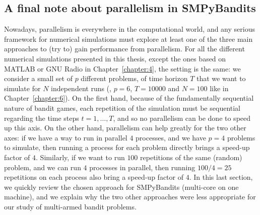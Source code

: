 \begin{small}
    \inputminted[linenos=true,numbersep=5pt,frame=lines,framesep=2mm]{python3}{2-Chapters/3-Chapter/src/example_of_configuration_singleplayer.py}
\end{small}


\subsection{A final note about parallelism in SMPyBandits}
\label{sub:3:parallelSimulations}

Nowadays, parallelism is everywhere in the computational world, and any serious framework for numerical simulations must explore at least one of the three main approaches to (try to) gain performance from parallelism.
%
For all the different numerical simulations presented in this thesis, except the ones based on MATLAB or GNU Radio in Chapter~\ref{chapter:4}, the setting is the same: we consider a small set of $p$ different problems, of time horizon $T$ that we want to simulate for $N$ independent runs (\eg, $p=6$, $T=10000$ and $N=100$ like in Chapter~\ref{chapter:6}).
On the first hand, because of the fundamentally sequential nature of bandit games, each repetition of the simulation must be sequential regarding the time steps $t=1,\dots,T$, and so no parallelism can be done to speed up this axis.
On the other hand, parallelism can help greatly for the two other axes: if we have a way to run in parallel $4$ processes, and we have $p=4$ problems to simulate, then running a process for each problem directly brings a speed-up factor of $4$.
Similarly, if we want to run $100$ repetitions of the same (random) problem, and we can run $4$ processes in parallel, then running $100/4=25$ repetitions on each process also bring a speed-up factor of $4$.
%
In this last section, we quickly review the chosen approach for SMPyBandits (multi-core on one machine), and we explain why the two other approaches were less appropriate for our study of multi-armed bandit problems.

